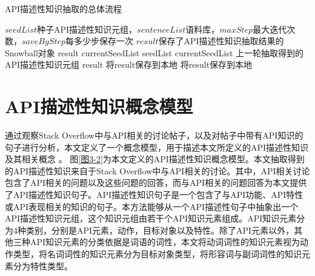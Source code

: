 \renewcommand{\algorithmicrequire}{\textbf{输入:}}  
\renewcommand{\algorithmicensure}{\textbf{输出:}}  
\begin{algorithm}  
    \caption{API描述性知识抽取的总体流程}  
    \begin{algorithmic}[1] %
        \Require $seedList$种子API描述性知识元组，$sentenceList$语料库，$maxStep$最大迭代次数，$saveByStep$每多少步保存一次  
        \Ensure $result$保存了API描述性知识抽取结果的Snowball对象  
            \State result \gets []
                    \State currentSeedList \gets seedList
                \Else
                    \State currentSeedList \gets 上一轮抽取得到的API描述性知识元组
                \EndIf
                \State result \gets {}
                    \State 将result保存到本地
                \EndIf
            \EndFor
            \State 将result保存到本地
            \State {}  
        \EndFunction  
    \end{algorithmic}  
\end{algorithm} 

\section{API描述性知识概念模型}
通过观察Stack Overflow中与API相关的讨论帖子，以及对帖子中带有API知识的句子进行分析，本文定义了一个概念模型，用于描述本文所定义的API描述性知识及其相关概念
。
图\ref{图3-2}为本文定义的API描述性知识概念模型。本文抽取得到的API描述性知识来自于Stack Overflow中与API相关的讨论。其中，API相关讨论包含了API相关的问题以及这些问题的回答，而与API相关的问题回答为本文提供了API描述性知识句子。API描述性知识句子是一个包含了与API功能、API特性或API表现相关的知识的句子。本方法能够从一个API描述性句子中抽象出一个API描述性知识元组，这个知识元组由若干个API知识元素组成。API知识元素分为4种类别，分别是API元素，动作，目标对象以及特性。除了API元素以外，其他三种API知识元素的分类依据是词语的词性，本文将动词词性的知识元素视为动作类型，将名词词性的知识元素分为目标对象类型，将形容词与副词词性的知识元素分为特性类型。

